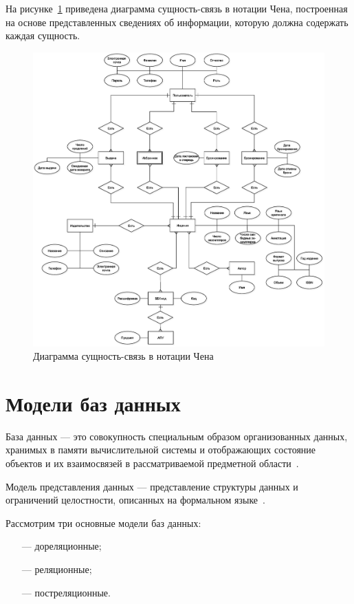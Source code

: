 На рисунке~\ref{fig:chen} приведена диаграмма сущность-связь в нотации Чена, построенная на основе представленных сведениях об информации, которую должна содержать каждая сущность.
\begin{figure}[H]
	\centering
	\includegraphics[scale=0.4]{img/ER.eps}
	\caption{Диаграмма сущность-связь в нотации Чена}
	\label{fig:chen}
\end{figure}

\section{Модели баз данных}
База данных --- это совокупность специальным образом организованных данных, хранимых в памяти вычислительной системы и отображающих состояние объектов и их взаимосвязей в рассматриваемой предметной области~\cite{DB}.

Модель представления данных --- представление структуры данных и ограничений целостности, описанных на формальном языке~\cite{Data_model}.

Рассмотрим три основные модели баз данных:

\begin{itemize}
	\item[---] дореляционные;
	\item[---] реляционные;
	\item[---] постреляционные.
\end{itemize}

